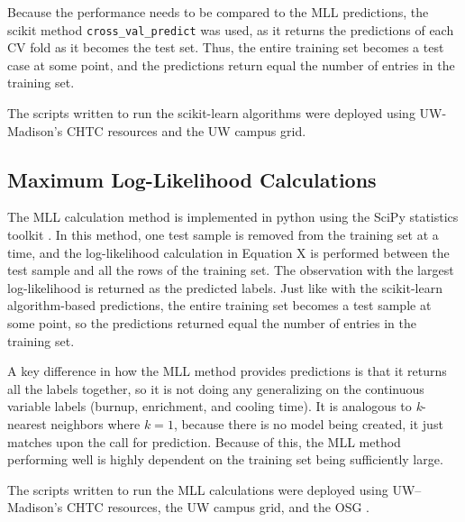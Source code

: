 Because the performance needs to be compared to the \gls{MLL} predictions, the
scikit method \texttt{cross\_val\_predict} was used, as it returns the
predictions of each \gls{CV} fold as it becomes the test set. Thus, the entire
training set becomes a test case at some point, and the predictions return
equal the number of entries in the training set.

The scripts written to run the scikit-learn algorithms were deployed using
\gls{UW}-Madison's \gls{CHTC} resources and the \gls{UW} campus grid. 

\subsection{Maximum Log-Likelihood Calculations}

The \gls{MLL} calculation method is implemented in python using the SciPy
statistics toolkit \cite{scipy}. In this method, one test sample is removed
from the training set at a time, and the log-likelihood calculation in Equation
X  is performed between the test sample and all the rows of
the training set.  The observation with the largest log-likelihood is returned
as the predicted labels. Just like with the scikit-learn algorithm-based 
predictions, the entire training set becomes a test sample at some point, so
the predictions returned equal the number of entries in the training set.

A key difference in how the \gls{MLL} method provides predictions is that it
returns all the labels together, so it is not doing any generalizing on the
continuous variable labels (burnup, enrichment, and cooling time). It is
analogous to \textit{k}-nearest neighbors where $k = 1$, because there is no
model being created, it just matches upon the call for prediction. Because of
this, the \gls{MLL} method performing well is highly dependent on the training
set being sufficiently large. 

The scripts written to run the \gls{MLL} calculations were deployed using
\gls{UW}--Madison's \gls{CHTC} resources, the \gls{UW} campus grid, and the 
\gls{OSG} \cite{osg07, osg09}. 
